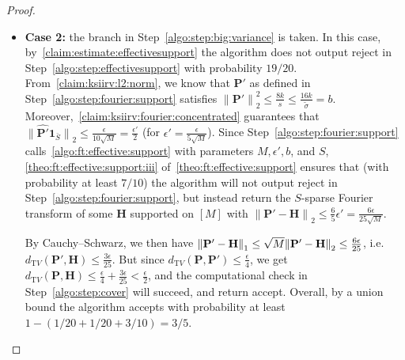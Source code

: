 \documentclass[11pt]{article}
\theoremstyle{definition}
\newcommand{\p}{\mathbf{P}}
\newcommand{\h}{\mathbf{H}}
\newcommand{\dtv}{d_{\mathrm TV}}
\newcommand{\eps}{\epsilon}
\newcommand{\norm}[1]{\lVert#1\rVert}
\newcommand{\normtwo}[1]{{\norm{#1}}_2}
\newcommand{\accept}{\textsf{accept}\xspace}
\newcommand{\reject}{\textsf{reject}\xspace}
\newcommand{\fourier}[1]{\widehat{#1}}
\begin{document}
\begin{proof}
\begin{itemize}
\item\textbf{Case 2:} the branch in Step~\ref{algo:step:big:variance} is taken.
In this case, by~\cref{claim:estimate:effectivesupport} the algorithm does not output \reject in Step~\ref{algo:step:effectivesupport} with probability $19/20$. From~\cref{claim:ksiirv:l2:norm}, we know that $\p'$ as defined in Step~\ref{algo:step:fourier:support} satisfies $\normtwo{\p'}^2 \leq \frac{8k}{s}\leq \frac{16k}{\widetilde{\sigma}} = b$.  Moreover,~\cref{claim:ksiirv:fourier:concentrated} guarantees that $\normtwo{\fourier{\p'}\mathbf{1}_{\bar{S}}} \leq \frac{\eps}{10\sqrt{M}} = \frac{\eps'}{2}$ (for $\eps' = \frac{\eps}{5\sqrt{M}}$). Since Step~\ref{algo:step:fourier:support} calls~\cref{algo:ft:effective:support} with parameters $M, \eps', b$, and $S$, \cref{theo:ft:effective:support:iii} of~\cref{theo:ft:effective:support} ensures that (with probability at least $7/10$) the algorithm will not output \reject in Step~\ref{algo:step:fourier:support}, but instead return the $S$-sparse Fourier transform of some $\h$ supported on $[M]$ with $\normtwo{\p'-\h} \leq \frac{6}{5}\eps' = \frac{6\eps}{25\sqrt{M}}$. 

By Cauchy--Schwarz, we then have $\normone{\p'-\h} \leq \sqrt{M}\normtwo{\p'-\h} \leq \frac{6\eps}{25}$, i.e. $\dtv(\p',\h) \leq \frac{3\eps}{25}$. But since
$\dtv(\p,\p') \leq \frac{\eps}{4}$, we get $\dtv(\p,\h) \leq \frac{\eps}{4}+\frac{3\eps}{25} < \frac{\eps}{2}$, and the computational check in Step~\ref{algo:step:cover} will succeed, and return \accept.
Overall, by a union bound the algorithm accepts with probability at least $1-(1/20+1/20+3/10)=3/5$.
\end{itemize}
\end{proof}
\end{document}
